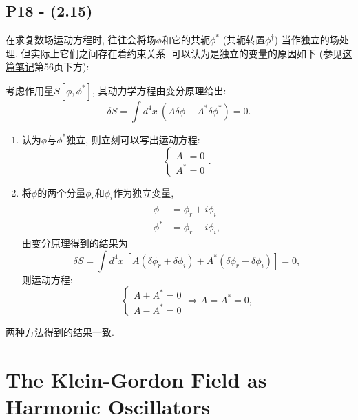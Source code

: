 \subsection{P18 - (2.15)}

在求复数场运动方程时, 往往会将场$\phi$和它的共轭$\phi^*$ (共轭转置$\phi^\dagger$) 当作独立的场处理, 但实际上它们之间存在着约束关系.
可以认为是独立的变量的原因如下 (参见\href{https://arxiv.org/abs/1110.5013v5}{这篇笔记}第56页下方):

考虑作用量$S[\phi,\phi^*]$, 其动力学方程由变分原理给出:
\begin{equation*}
  \delta S = \int d^4x\ (A\delta\phi + A^*\delta\phi^*) = 0.
\end{equation*}

\begin{enumerate}
  \item 认为$\phi$与$\phi^*$独立, 则立刻可以写出运动方程:
        \begin{equation*}
          \left\{\begin{array}{c}
            A^{\phantom{*}} = 0 \\
            A^* = 0
          \end{array}\right..
        \end{equation*}

  \item 将$\phi$的两个分量$\phi_r$和$\phi_i$作为独立变量,
        \begin{align*}
          \phi^{\phantom{*}} & = \phi_r + i\phi_i  \\
          \phi^*             & = \phi_r - i\phi_i,
        \end{align*}
        由变分原理得到的结果为
        \begin{equation*}
          \delta S = \int d^4x\ [A(\delta\phi_r+\delta\phi_i) + A^*(\delta\phi_r-\delta\phi_i)] = 0,
        \end{equation*}
        则运动方程:
        \begin{equation*}
          \left\{\begin{array}{c}
            A + A^* = 0 \\
            A - A^* = 0
          \end{array}\right.\Rightarrow A = A^* = 0,
        \end{equation*}
\end{enumerate}
两种方法得到的结果一致.

\section{The Klein-Gordon Field as Harmonic Oscillators}

